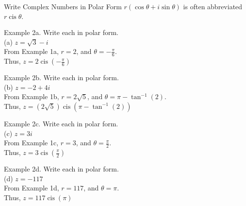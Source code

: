 \documentclass[t,usenames,dvipsnames]{beamer}
\DeclareMathOperator\cis{cis}
\begin{document}
\begin{frame}{Write Complex Numbers in Polar Form}
    $r(\cos\theta + i\sin\theta)$ is often abbreviated $r\cis\theta$.
\end{frame}

\begin{frame}{Example 2a.}
    Write each in polar form.   \newline\\
    (a) \quad $z = \sqrt{3} - i$    \newline\\  \pause
    From Example 1a, $r = 2$, and $\theta = -\frac{\pi}{6}$.    \newline\\  
    Thus, $z = 2\cis\left(-\frac{\pi}{6}\right)$
\end{frame}

\begin{frame}{Example 2b.}
    Write each in polar form.   \newline\\
    (b) \quad $z = -2 + 4i$    \newline\\  \pause
    From Example 1b, $r = 2\sqrt{5}$, and $\theta = \pi - \tan^{-1}(2)$.    \newline\\  
    Thus, $z = \left(2\sqrt{5}\right)\cis\left(\pi - \tan^{-1}(2)\right)$
\end{frame}

\begin{frame}{Example 2c.}
    Write each in polar form.   \newline\\
    (c) \quad $z = 3i$    \newline\\  \pause
    From Example 1c, $r = 3$, and $\theta = \frac{\pi}{2}$.    \newline\\  
    Thus, $z = 3\cis\left(\frac{\pi}{2}\right)$
\end{frame}

\begin{frame}{Example 2d.}
    Write each in polar form.   \newline\\
    (d) \quad $z = -117$    \newline\\  \pause
    From Example 1d, $r = 117$, and $\theta = \pi$.    \newline\\  
    Thus, $z = 117\cis\left(\pi\right)$
\end{frame}
\end{document}
